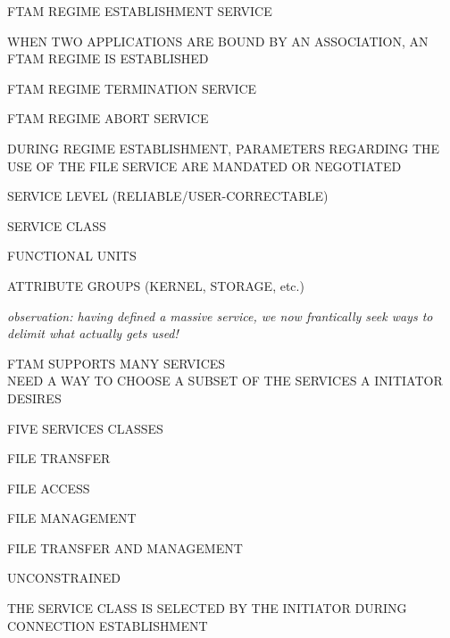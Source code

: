 \begin{bwslide}

\begin{nrtc}
\item	FTAM REGIME ESTABLISHMENT SERVICE
    \begin{nrtc}
    \item	WHEN TWO APPLICATIONS ARE BOUND BY AN ASSOCIATION,
		AN FTAM REGIME IS ESTABLISHED    
    \end{nrtc}

\item	FTAM REGIME TERMINATION SERVICE

\item	FTAM REGIME ABORT SERVICE

\item	DURING REGIME ESTABLISHMENT,
	PARAMETERS REGARDING THE USE OF THE FILE SERVICE ARE MANDATED OR
	NEGOTIATED
    \begin{nrtc}
    \item	SERVICE LEVEL (RELIABLE/USER-CORRECTABLE)

    \item	SERVICE CLASS

    \item	FUNCTIONAL UNITS

    \item	ATTRIBUTE GROUPS (KERNEL, STORAGE, etc.)
    \end{nrtc}
\end{nrtc}
\end{bwslide}


\begin{note}\em
observation: having defined a massive service,
we now frantically seek ways to delimit what actually gets used!
\end{note}


\begin{bwslide}

\begin{nrtc}
\item	FTAM SUPPORTS MANY SERVICES\\
	NEED A WAY TO CHOOSE A SUBSET OF THE SERVICES A INITIATOR DESIRES

\item	FIVE SERVICES CLASSES
    \begin{nrtc}
    \item	FILE TRANSFER

    \item	FILE ACCESS

    \item	FILE MANAGEMENT

    \item	FILE TRANSFER AND MANAGEMENT

    \item	UNCONSTRAINED
    \end{nrtc}

\item	THE SERVICE CLASS IS SELECTED BY THE INITIATOR DURING CONNECTION
	ESTABLISHMENT
\end{nrtc}
\end{bwslide}


